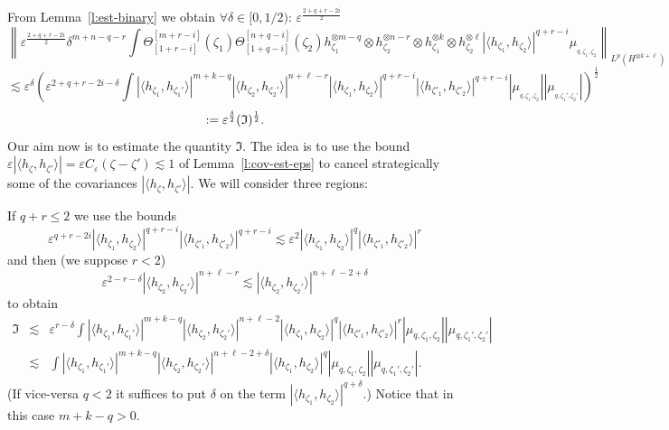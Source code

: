 From Lemma~\ref{l:est-binary} we obtain $\forall \delta \in [0, 1 / 2)$:
$\varepsilon^{\frac{2 + q + r - 2 i}{2}}$
\[ \left\| \varepsilon^{\frac{2 + q + r - 2 i}{2}} \delta^{m + n - q - r} \int
   \Theta^{[m + r - i]}_{[1 + r - i]} (\zeta_1) \Theta_{[1 + q - i]}^{[n + q -
   i]} (\zeta_2) h_{\zeta_1}^{\otimes m - q} \otimes h^{\otimes n -
   r}_{\zeta_2} \otimes h^{\otimes k}_{\zeta_1} \otimes h^{\otimes
   \ell}_{\zeta_2} | \langle h_{\zeta_1}, h_{\zeta_2} \rangle |^{q + r - i}
   \mu_{_{q, \zeta_1, \zeta_2}} \right\|_{L^p (H^{\otimes k + \ell})} \]
\[ \lesssim \varepsilon^{\delta} \left( \varepsilon^{2 + q + r - 2 i - \delta}
   \int | \langle h_{\zeta_1}, h_{\zeta_1'} \rangle |^{m + k - q} | \langle
   h_{\zeta_2}, h_{\zeta_2'} \rangle |^{n + \ell - r} | \langle h_{\zeta_1},
   h_{\zeta_2} \rangle |^{q + r - i} | \langle h_{\zeta'_1}, h_{\zeta'_2}
   \rangle |^{q + r - i} \left| \mu_{_{q, \zeta_1, \zeta_2}} \right| \left|
   \mu_{_{q, \zeta_1', \zeta_2'}} \right| \right)^{\frac{1}{2}} \]
\[ := \varepsilon^{\frac{\delta}{2}} (\mathfrak{I})^{\frac{1}{2}} . \]
Our aim now is to estimate the quantity $\mathfrak{I}$. The idea is to use the
bound $\varepsilon | \langle h_{\zeta}, h_{\zeta'} \rangle | = \varepsilon
C_{\varepsilon} (\zeta - \zeta') \lesssim 1$ of Lemma~\ref{l:cov-est-eps} to
cancel strategically some of the covariances $| \langle h_{\zeta}, h_{\zeta'}
\rangle |$. We will consider three regions:

If $q + r \leqslant 2$ we use the bounds
\[ \varepsilon^{q + r - 2 i} | \langle h_{\zeta_1}, h_{\zeta_2} \rangle |^{q +
   r - i} | \langle h_{\zeta'_1}, h_{\zeta'_2} \rangle |^{q + r - i} \lesssim
   \varepsilon^2 | \langle h_{\zeta_1}, h_{\zeta_2} \rangle |^q | \langle
   h_{\zeta'_1}, h_{\zeta'_2} \rangle |^r \]
and then (we suppose $r < 2$)
\[ \varepsilon^{2 - r - \delta} | \langle h_{\zeta_2}, h_{\zeta_2'} \rangle
   |^{n + \ell - r} \lesssim | \langle h_{\zeta_2}, h_{\zeta_2'} \rangle |^{n
   + \ell - 2 + \delta} \]
to obtain
\begin{eqnarray}
  \mathfrak{I} & \lesssim & \varepsilon^{r - \delta} \int | \langle
  h_{\zeta_1}, h_{\zeta_1'} \rangle |^{m + k - q} | \langle h_{\zeta_2},
  h_{\zeta_2'} \rangle |^{n + \ell - 2} | \langle h_{\zeta_1}, h_{\zeta_2}
  \rangle |^q | \langle h_{\zeta'_1}, h_{\zeta'_2} \rangle |^r | \mu_{q,
  \zeta_1, \zeta_2} | | \mu_{q, \zeta_1', \zeta_2'} | \nonumber\\
  & \lesssim & \int | \langle h_{\zeta_1}, h_{\zeta_1'} \rangle |^{m + k - q}
  | \langle h_{\zeta_2}, h_{\zeta_2'} \rangle |^{n + \ell - 2 + \delta} |
  \langle h_{\zeta_1}, h_{\zeta_2} \rangle |^q | \mu_{q, \zeta_1, \zeta_2} | |
  \mu_{q, \zeta_1', \zeta_2'} | .  \label{e:graph-est-1}
\end{eqnarray}
(If vice-versa $q < 2$ it suffices to put $\delta$ on the term $| \langle
h_{\zeta_1}, h_{\zeta_2} \rangle |^{q + \delta}$.) Notice that in this case $m
+ k - q > 0.$

